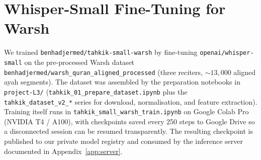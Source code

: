 \chapter{Whisper-Small Fine-Tuning for Warsh}
\label{app:training}

We trained \texttt{benhadjermed/tahkik-small-warsh} by fine-tuning
\texttt{openai/whisper-small} on the pre-processed Warsh dataset
\texttt{benhadjermed/warsh\_quran\_aligned\_processed} (three reciters,
${\sim}13{,}000$ aligned ayah segments). The dataset was assembled by
the preparation notebooks in \texttt{project-L3/} (\texttt{tahkik\_01\_prepare\_dataset.ipynb}
plus the \texttt{tahkik\_dataset\_v2\_*} series for download,
normalisation, and feature extraction). Training itself runs in
\texttt{tahkik\_small\_warsh\_train.ipynb} on Google Colab Pro
(NVIDIA T4 / A100), with checkpoints saved every 250 steps to Google
Drive so a disconnected session can be resumed transparently. The
resulting checkpoint is published to our private model registry and
consumed by the inference server documented in Appendix~\ref{app:server}.

